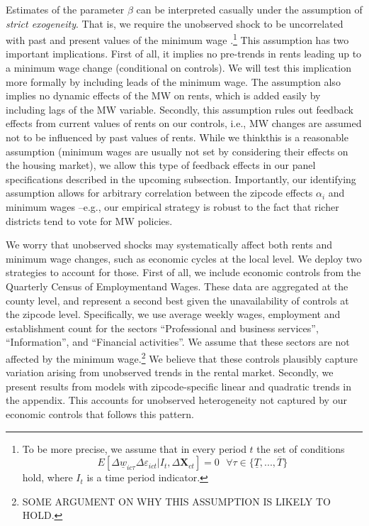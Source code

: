Estimates of the parameter $\beta$ can be interpreted casually under the assumption of
\textit{strict exogeneity}. That is, we require the unobserved shock to be uncorrelated
with past and present values of the minimum wage \parencite[][chapter 10]
{wooldridge2010}.\footnote{To be more precise, we assume that in every period $t$ the set of 
	conditions 
	$$E[\Delta \underline{w}_{ic\tau} \Delta \varepsilon_{ict} | I_t, \Delta \mathbf{X}_{ct}] = 0
	\ \ \ \forall \tau \in \{\underline{T}, ..., \overline{T}\}$$
	hold, where $I_t$ is a time period indicator.}
This assumption has two important implications. First of all, it implies no pre-trends in 
rents leading up to a minimum wage change (conditional on controls). We will test this 
implication more formally by including leads of the minimum wage. The assumption also implies
no dynamic effects of the MW on rents, which is added easily by including lags of the MW 
variable. Secondly, this assumption rules out feedback effects from current values of rents 
on our controls, i.e., MW changes are assumed not to be influenced by past values of rents. 
While we thinkthis is a reasonable assumption (minimum wages are usually not set by considering 
their effects on the housing market), we allow this type of feedback effects in our panel 
specifications described in the upcoming subsection. Importantly, our identifying assumption 
allows for arbitrary correlation between the zipcode effects $\alpha_i$ and minimum wages 
--e.g., our empirical strategy is robust to the fact that richer districts tend to vote for 
MW policies.


We worry that unobserved shocks may systematically affect both rents and minimum wage 
changes, such as economic cycles at the local level. We deploy two strategies to account 
for those. First of all, we include economic controls from the Quarterly Census of 
Employmentand Wages. These data are aggregated at the county level, and represent a 
second best given the unavailability of controls at the zipcode level. Specifically, we 
use average weekly wages, employment and establishment count for the sectors 
``Professional and business services'', ``Information'', and ``Financial activities''. 
We assume that these sectors are not affected by the minimum wage.\footnote{SOME ARGUMENT
	ON WHY THIS ASSUMPTION IS LIKELY TO HOLD.}
We believe that these controls plausibly capture variation arising from unobserved trends 
in the rental market. Secondly, we present results from models with zipcode-specific linear 
and quadratic trends in the appendix. This accounts for unobserved heterogeneity not 
captured by our economic controls that follows this pattern.

